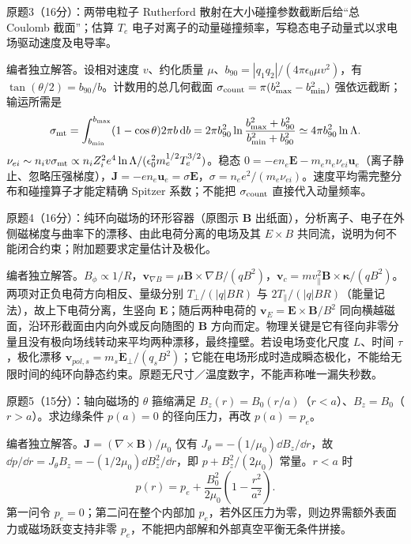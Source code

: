 \begin{exercise}\label{ex:hist02-mid-3}
原题3（16分）：两带电粒子 Rutherford 散射在大小碰撞参数截断后给“总 Coulomb 截面”；估算 $T_e$ 电子对离子的动量碰撞频率，写稳态电子动量式以求电场驱动速度及电导率。
\end{exercise}
\begin{solution}
编者独立解答。设相对速度 $v$、约化质量 $\mu$、$b_{90}=|q_1q_2|/(4\pi\epsilon_0\mu v^2)$，有 $\tan(\theta/2)=b_{90}/b$。计数用的总几何截面 $\sigma_{\rm count}=\pi(b_{\max}^2-b_{\min}^2)$ 强依远截断；输运所需是
\begin{equation}\sigma_{\rm mt}=\int_{b_{\min}}^{b_{\max}}(1-\cos\theta)2\pi b\,\mathrm d b=2\pi b_{90}^2\ln\frac{b_{\max}^2+b_{90}^2}{b_{\min}^2+b_{90}^2}\simeq4\pi b_{90}^2\ln\Lambda.
\end{equation}
$\nu_{ei}\sim n_iv\sigma_{\rm mt}\propto n_iZ_i^2e^4\ln\Lambda/(\epsilon_0^2m_e^{1/2}T_e^{3/2})$。稳态 $0=-en_e\mathbf E-m_en_e\nu_{ei}\mathbf u_e$（离子静止、忽略压强梯度），$\mathbf J=-en_e\mathbf u_e=\sigma\mathbf E$，$\sigma=n_ee^2/(m_e\nu_{ei})$。速度平均需完整分布和碰撞算子才能定精确 Spitzer 系数；不能把 $\sigma_{\rm count}$ 直接代入动量频率。
\end{solution}

\begin{exercise}\label{ex:hist02-mid-4}
原题4（16分）：纯环向磁场的环形容器（原图示 $\mathbf B$ 出纸面），分析离子、电子在外侧磁梯度与曲率下的漂移、由此电荷分离的电场及其 $E\times B$ 共同流，说明为何不能闭合约束；附加题要求定量估计及极化。
\end{exercise}
\begin{solution}
编者独立解答。$B_\phi\propto1/R$，$\mathbf v_{\nabla B}=\mu\mathbf B\times\nabla B/(qB^2)$，$\mathbf v_c=mv_\parallel^2\mathbf B\times\boldsymbol\kappa/(qB^2)$。两项对正负电荷方向相反、量级分别 $T_\perp/(|q|BR)$ 与 $2T_\parallel/(|q|BR)$（能量记法），故上下电荷分离，生竖向 $\mathbf E$；随后两种电荷的 $\mathbf v_E=\mathbf E\times\mathbf B/B^2$ 同向横越磁面，沿环形截面由内向外或反向随图的 $\mathbf B$ 方向而定。物理关键是它有径向非零分量且没有极向场线转动来平均两种漂移，最终撞壁。若设电场变化尺度 $L$、时间 $\tau$，极化漂移 $\mathbf v_{pol,s}=m_s\dot{\mathbf E}_\perp/(q_sB^2)$；它能在电场形成时造成瞬态极化，不能给无限时间的纯环向静态约束。原题无尺寸／温度数字，不能声称唯一漏失秒数。
\end{solution}

\begin{exercise}\label{ex:hist02-mid-5}
原题5（15分）：轴向磁场的 $\theta$ 箍缩满足 $B_z(r)=B_0(r/a)$（$r<a$）、$B_z=B_0$（$r>a$）。求边缘条件 $p(a)=0$ 的径向压力，再改 $p(a)=p_e$。
\end{exercise}
\begin{solution}
编者独立解答。$\mathbf J=(\nabla\times\mathbf B)/\mu_0$ 仅有 $J_\theta=-(1/\mu_0)\dd B_z/\dd r$，故 $\dd p/\dd r=J_\theta B_z=-(1/2\mu_0)\dd B_z^2/\dd r$，即 $p+B_z^2/(2\mu_0)$ 常量。$r<a$ 时
\begin{equation}p(r)=p_e+\frac{B_0^2}{2\mu_0}\left(1-\frac{r^2}{a^2}\right).
\end{equation}
第一问令 $p_e=0$；第二问在整个内部加 $p_e$，若外区压力为零，则边界需额外表面力或磁场跃变支持非零 $p_e$，不能把内部解和外部真空平衡无条件拼接。
\end{solution}

